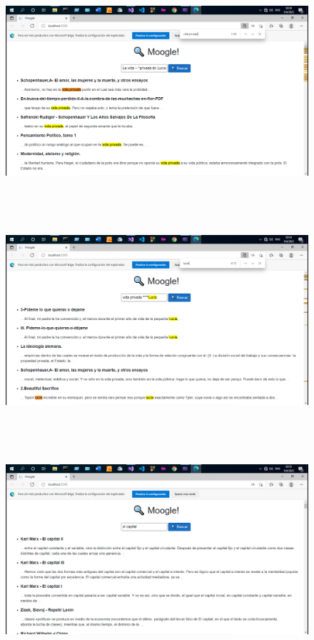\documentclass[a4paper,12pt]{report}
\begin{document}
\newpage

\begin{figure}[h]
    \includegraphics*[width=15cm, height=8cm]{fotos/13 - Resultados (6).png}
\end{figure}

\medskip

\begin{figure}[h]
    \includegraphics*[width=15cm, height=8cm]{fotos/14 - Resultados (7).png}
\end{figure}

\newpage

\begin{figure}[h]
    \includegraphics*[width=15cm, height=8cm]{fotos/15 - Resultados (8).png}
\end{figure}
\end{document}
